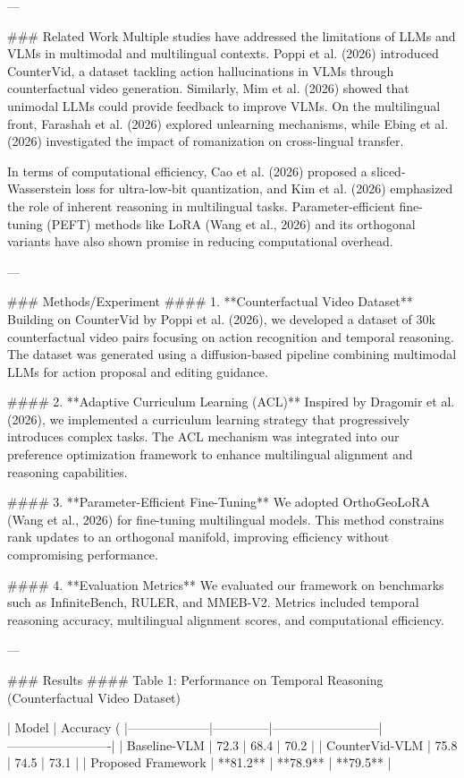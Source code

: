 ---

### Related Work
Multiple studies have addressed the limitations of LLMs and VLMs in multimodal and multilingual contexts. Poppi et al. (2026) introduced CounterVid, a dataset tackling action hallucinations in VLMs through counterfactual video generation. Similarly, Mim et al. (2026) showed that unimodal LLMs could provide feedback to improve VLMs. On the multilingual front, Farashah et al. (2026) explored unlearning mechanisms, while Ebing et al. (2026) investigated the impact of romanization on cross-lingual transfer.

In terms of computational efficiency, Cao et al. (2026) proposed a sliced-Wasserstein loss for ultra-low-bit quantization, and Kim et al. (2026) emphasized the role of inherent reasoning in multilingual tasks. Parameter-efficient fine-tuning (PEFT) methods like LoRA (Wang et al., 2026) and its orthogonal variants have also shown promise in reducing computational overhead.

---

### Methods/Experiment
#### 1. **Counterfactual Video Dataset**
Building on CounterVid by Poppi et al. (2026), we developed a dataset of 30k counterfactual video pairs focusing on action recognition and temporal reasoning. The dataset was generated using a diffusion-based pipeline combining multimodal LLMs for action proposal and editing guidance.

#### 2. **Adaptive Curriculum Learning (ACL)**
Inspired by Dragomir et al. (2026), we implemented a curriculum learning strategy that progressively introduces complex tasks. The ACL mechanism was integrated into our preference optimization framework to enhance multilingual alignment and reasoning capabilities.

#### 3. **Parameter-Efficient Fine-Tuning**
We adopted OrthoGeoLoRA (Wang et al., 2026) for fine-tuning multilingual models. This method constrains rank updates to an orthogonal manifold, improving efficiency without compromising performance.

#### 4. **Evaluation Metrics**
We evaluated our framework on benchmarks such as InfiniteBench, RULER, and MMEB-V2. Metrics included temporal reasoning accuracy, multilingual alignment scores, and computational efficiency.

---

### Results
#### Table 1: Performance on Temporal Reasoning (Counterfactual Video Dataset)

| Model              | Accuracy (%
|--------------------|--------------|--------------------------|-------------------------|
| Baseline-VLM       | 72.3         | 68.4                    | 70.2                   |
| CounterVid-VLM     | 75.8         | 74.5                    | 73.1                   |
| Proposed Framework | **81.2**     | **78.9**                | **79.5**               |


